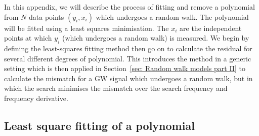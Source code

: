 In this appendix, we will describe the process of fitting and remove a
polynomial from $N$ data points $(y_i, x_i)$ which undergoes a random walk. The
polynomial will be fitted using a least squares minimisation. The $x_i$ are
the independent points at which $y_i$ (which undergoes a random walk) is
measured. We begin by defining the least-squares fitting method then
go on to calculate the residual for several different degrees of polynomial.
This introduces the method in a generic setting which is then applied
in Section~\ref{sec: Random walk models part II} to calculate the mismatch for
a GW signal which undergoes a random walk, but in which the search minimises
the mismatch over the search frequency and frequency derivative.

\subsection{Least square fitting of a polynomial}

